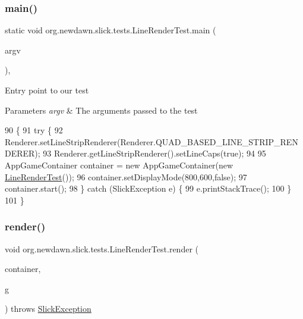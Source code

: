 \subsubsection{\texorpdfstring{main()}{main()}}
{\footnotesize\ttfamily static void org.\+newdawn.\+slick.\+tests.\+Line\+Render\+Test.\+main (\begin{DoxyParamCaption}\item[{String \mbox{[}$\,$\mbox{]}}]{argv }\end{DoxyParamCaption})\hspace{0.3cm}{\ttfamily [inline]}, {\ttfamily [static]}}

Entry point to our test


\begin{DoxyParams}{Parameters}
{\em argv} & The arguments passed to the test \\
\hline
\end{DoxyParams}

\begin{DoxyCode}
90                                            \{
91         \textcolor{keywordflow}{try} \{
92             Renderer.setLineStripRenderer(Renderer.QUAD\_BASED\_LINE\_STRIP\_RENDERER);
93             Renderer.getLineStripRenderer().setLineCaps(\textcolor{keyword}{true});
94             
95             AppGameContainer container = \textcolor{keyword}{new} AppGameContainer(\textcolor{keyword}{new} \mbox{\hyperlink{classorg_1_1newdawn_1_1slick_1_1tests_1_1_line_render_test_a65089738ee2b44a06070e64f630cc2d3}{LineRenderTest}}());
96             container.setDisplayMode(800,600,\textcolor{keyword}{false});
97             container.start();
98         \} \textcolor{keywordflow}{catch} (SlickException e) \{
99             e.printStackTrace();
100         \}
101     \}
\end{DoxyCode}
\mbox{\label{classorg_1_1newdawn_1_1slick_1_1tests_1_1_line_render_test_a6193c85f0e7e66eff8bf5994f7564abe}} 
\subsubsection{\texorpdfstring{render()}{render()}}
{\footnotesize\ttfamily void org.\+newdawn.\+slick.\+tests.\+Line\+Render\+Test.\+render (\begin{DoxyParamCaption}\item[{\mbox{\hyperlink{classorg_1_1newdawn_1_1slick_1_1_game_container}{Game\+Container}}}]{container,  }\item[{\mbox{\hyperlink{classorg_1_1newdawn_1_1slick_1_1_graphics}{Graphics}}}]{g }\end{DoxyParamCaption}) throws \mbox{\hyperlink{classorg_1_1newdawn_1_1slick_1_1_slick_exception}{Slick\+Exception}}\hspace{0.3cm}{\ttfamily [inline]}}

